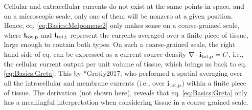 Cellular  and extracellular currents do not exist at the same points in space, and on a microscopic scale,  only one of them will be nonzero at a given position. Hence, eq. \ref{eq:Basics:Melpomene2} only makes sense on a coarse-grained scale, where ${\bf i}_\text{tot,p}$ and ${\bf i}_\text{tot,t}$ represent the currents averaged over a finite piece of tissue, large enough to contain both types. On such a coarse-grained scale, the right hand side of eq. \label{eq:Basics:Melpomene2} can be expressed as a current source density ${\bf \nabla} \cdot {\bf i}_\text{tot,p} = C$, i.e., the cellular current output per unit volume of tissue, which brings us back to eq. \ref{eq:Basics:Greta}. This  by \citeasnoun**{Gratiy2017}, who performed a spatial averaging over all the intracellular and membrane currents (i.e., over ${\bf i}_\text{tot,p}$) within a finite piece of tissue. The derivation (not shown here), reveals that eq. \ref{eq:Basics:Greta} only has a meaningful interpretation when considering tissue in a coarse grained scale.

